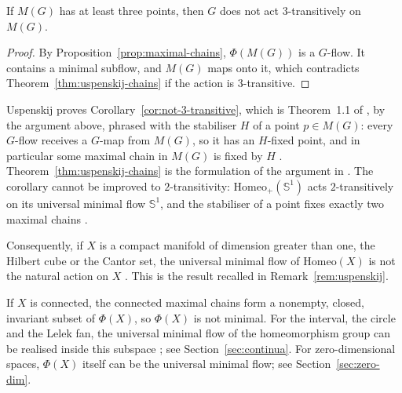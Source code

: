 \begin{corollary}\label{cor:not-3-transitive}
If $M(G)$ has at least three points, then $G$ does not act $3$-transitively on
$M(G)$.
\end{corollary}

\begin{proof}
By Proposition~\ref{prop:maximal-chains}, $\Phi(M(G))$ is a $G$-flow. It
contains a minimal subflow, and $M(G)$ maps onto it, which contradicts
Theorem~\ref{thm:uspenskij-chains} if the action is $3$-transitive.
\end{proof}

\begin{remark}\label{rem:uspenskij-proof}
Uspenskij proves Corollary~\ref{cor:not-3-transitive}, which is Theorem~1.1
of \cite{Uspenskij2000}, by the argument above, phrased with the stabiliser
$H$ of a point $p\in M(G)$: every $G$-flow receives a $G$-map from $M(G)$, so
it has an $H$-fixed point, and in particular some maximal chain in $M(G)$ is
fixed by $H$ \cite[Proposition~2.2]{Uspenskij2000}.
Theorem~\ref{thm:uspenskij-chains} is the formulation of the argument in
\cite{GutmanTsankovZucker2021}. The corollary cannot be improved to
$2$-transitivity: $\mathrm{Homeo}_+(\mathbb{S}^1)$ acts $2$-transitively on
its universal minimal flow $\mathbb{S}^1$, and the stabiliser of a point fixes
exactly two maximal chains \cite[Example~2.3]{Uspenskij2000}.
\end{remark}

\begin{remark}\label{rem:not-natural-action}
Consequently, if $X$ is a compact manifold of dimension greater than one, the
Hilbert cube or the Cantor set, the universal minimal flow of
$\mathrm{Homeo}(X)$ is not the natural action on $X$
\cite{Uspenskij2000,GlasnerWeiss2003}. This is the result recalled in
Remark~\ref{rem:uspenskij}.
\end{remark}

\begin{remark}\label{rem:connected-chains}
If $X$ is connected, the connected maximal chains form a nonempty, closed,
invariant subset of $\Phi(X)$, so $\Phi(X)$ is not minimal. For the interval,
the circle and the Lelek fan, the universal minimal flow of the homeomorphism
group can be realised inside this subspace \cite{GutmanTsankovZucker2021}; see
Section~\ref{sec:continua}. For zero-dimensional spaces, $\Phi(X)$ itself can
be the universal minimal flow; see Section~\ref{sec:zero-dim}.
\end{remark}

